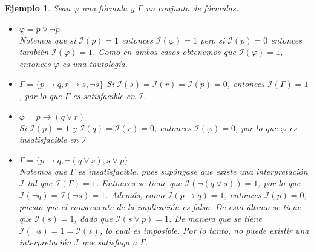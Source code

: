 \documentclass[letterpaper,12pt]{article}
\newtheorem{ejem}{Ejemplo}[]
\begin{document}
    \begin{ejem} 
        Sean $\varphi$ una fórmula y $\Gamma$ un conjunto de fórmulas.
        \begin{itemize}
            \item[i)] $\varphi = p \lor \neg p$ \\
            Notemos que si $\mathcal{I}(p) = 1$ entonces 
            $\mathcal{I}(\varphi) = 1$ pero si $\mathcal{I}(p) = 0$ entonces 
            también $\mathcal{I}(\varphi) = 1$. Como en ambos casos obtenemos 
            que $\mathcal{I}(\varphi) = 1$, entonces $\varphi$ es una 
            tautología.
            \item[ii)] $\Gamma = \{ p \rightarrow q, r \rightarrow s, \neg s\}$
            \newline 
            Si $\mathcal{I}(s) = \mathcal{I}(r) = \mathcal{I}(p) = 0$, entonces 
            $\mathcal{I}(\Gamma) = 1$, por lo que $\Gamma$ es satisfacible en 
            $\mathcal{I}$.
            \item[iii)] $\varphi = p \rightarrow (q \lor r)$ \\
            Si $\mathcal{I}(p) = 1$ y $\mathcal{I}(q) = \mathcal{I}(r) = 0$, 
            entonces $\mathcal{I}(\varphi) = 0$, por lo que $\varphi$ es 
            insatisfacible en $\mathcal{I}$
            \item[iv)] $\Gamma = \{ p \rightarrow q, \neg (q \lor s), 
            s \lor p\}$ \\
            Notemos que $\Gamma$ es insatisfacible, pues supóngase que existe 
            una interpretación $\mathcal{I}$ tal que $\mathcal{I}(\Gamma) = 1$. 
            Entonces se tiene que $\mathcal{I}(\neg (q \lor s)) = 1$, por lo 
            que $\mathcal{I}(\neg q) = \mathcal{I}(\neg s) = 1$. Además, como 
            $\mathcal{I}(p \rightarrow q) = 1$, entonces $\mathcal{I}(p) = 0$,
            puesto que el consecuente de la implicación es falso. De esto 
            último se tiene que $\mathcal{I}(s) = 1$, dado que 
            $\mathcal{I}(s \lor p) = 1$. De manera que se tiene 
            $\mathcal{I}(\neg s) = 1 = \mathcal{I}(s)$, lo cual es imposible. 
            Por lo tanto, no puede existir una interpretación $\mathcal{I}$ 
            que satisfaga a $\Gamma$.
        \end{itemize}
    \end{ejem}
\end{document}
